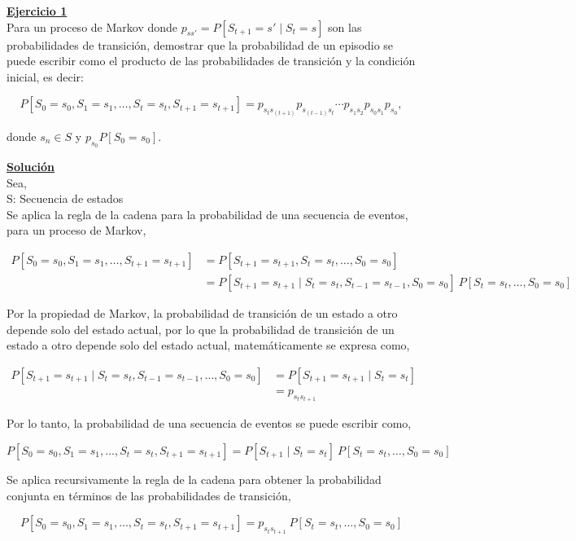 \indent\underline{\textbf{Ejercicio 1}}\\
Para un proceso de Markov donde \( p_{ss'} = P[S_{t+1} = s' \mid S_t = s] \) son las probabilidades de transición, demostrar que la probabilidad de un episodio se puede escribir como el producto de las probabilidades de transición y la condición inicial, es decir:

\[
    P[S_0 = s_0, S_1 = s_1, \ldots, S_t = s_t, S_{t+1} = s_{t+1}] = p_{s_t s_{(t+1)}} p_{s_{(t-1)} s_t} \cdots p_{s_1 s_2} p_{s_0 s_1} p_{s_0},
\]

donde \( s_n \in S \) y \( p_{s_0} P[S_0 = s_0] \).

\indent\underline{\textbf{Solución}}\\

Sea,\\
S: Secuencia de estados\\

Se aplica la regla de la cadena para la probabilidad de una secuencia de eventos, para un proceso de Markov,

\begin{align*}
    P[S_0 = s_0, S_1 = s_1, \ldots, S_{t+1} = s_{t+1}] &= P[S_{t+1} =s_{t+1}, S_t = s_t, \ldots, S_0 = s_0]\\
    &= P[S_{t+1} = s_{t+1} \mid S_t = s_t, S_{t-1} = s_{t-1}, S_0 = s_0] \ P[S_t = s_t, \ldots, S_0 = s_0]
\end{align*}

Por la propiedad de Markov, la probabilidad de transición de un estado a otro depende solo del estado actual, por lo que la probabilidad de transición de un estado a otro depende solo del estado actual, matemáticamente se expresa como,

\begin{align*}
    P[S_{t+1} = s_{t+1} \mid S_t = s_t, S_{t-1} = s_{t-1}, \ldots, S_0 = s_0] &= P[S_{t+1} = s_{t+1} \mid S_t = s_t]\\
    &= p_{s_t s_{t+1}}
\end{align*}

Por lo tanto, la probabilidad de una secuencia de eventos se puede escribir como,

\[
    P[S_0 = s_0, S_1 = s_1, \ldots, S_t = s_t, S_{t+1} = s_{t+1}] = P[S_{t+1} \mid S_t = s_t] \ P[S_t = s_t, \ldots, S_0 = s_0]
\]

Se aplica recursivamente la regla de la cadena para obtener la probabilidad conjunta en términos de las probabilidades de transición,

\[
    P[S_0 = s_0, S_1 = s_1, \ldots, S_t = s_t, S_{t+1} = s_{t+1}] = p_{s_t s_{t+1}} \ P[S_t = s_t, \ldots, S_0 = s_0]
\]

